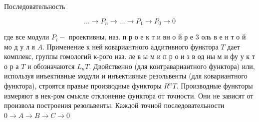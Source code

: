 \documentclass[10pt]{article}
\begin{document}
Последовательность



\[

\ldots \longrightarrow P_{n} \longrightarrow \ldots \longrightarrow P_{1} \longrightarrow P_{0} \longrightarrow 0

\]



где все модули $P_{i}-$ проективны, наз. п р о е к т и вн о й р е 3 оль в е н т о й мо д у л я $A$. Применение к ней ковариантного аддитивного функтора $T$ дает комплекс, группы гомологий к-рого наз. ле в ы м и п р о и з в од ны м и фу у к т о р а $T$ и обозначаются $L_{n} T$. Двойственно (для контравариантного функтора) или, используя инъективные модули и инъективные резольвенты (для ковариантного функтора), строятся правые производные функторы $R^{n} T$. Производные функторы измеряют в нек-ром смысле отклонение функтора от точности. Они не зависят от произвола построения резольвенты. Каждой точной последовательности $0 \rightarrow A \rightarrow B \rightarrow C \rightarrow 0$
\end{document}
